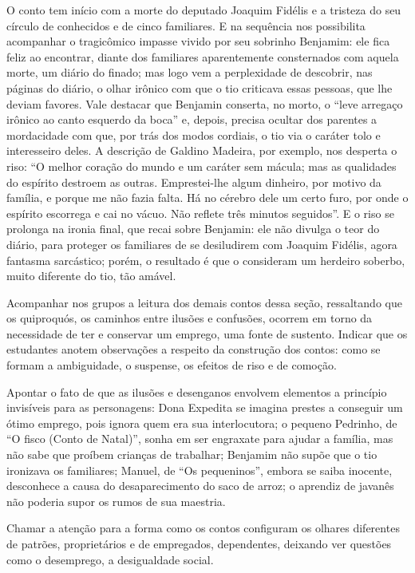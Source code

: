 O conto tem início com a morte do deputado Joaquim Fidélis e a tristeza
do seu círculo de conhecidos e de cinco familiares. E na sequência nos
possibilita acompanhar o tragicômico impasse vivido por seu sobrinho
Benjamim: ele fica feliz ao encontrar, diante dos familiares
aparentemente consternados com aquela morte, um diário do finado; mas
logo vem a perplexidade de descobrir, nas páginas do diário, o olhar
irônico com que o tio criticava essas pessoas, que lhe deviam favores.
Vale destacar que Benjamin conserta, no morto, o ``leve arregaço irônico
ao canto esquerdo da boca'' e, depois, precisa ocultar dos parentes a
mordacidade com que, por trás dos modos cordiais, o tio via o caráter
tolo e interesseiro deles. A descrição de Galdino Madeira, por exemplo,
nos desperta o riso: ``O melhor coração do mundo e um caráter sem
mácula; mas as qualidades do espírito destroem as outras. Emprestei-lhe
algum dinheiro, por motivo da família, e porque me não fazia falta. Há
no cérebro dele um certo furo, por onde o espírito escorrega e cai no
vácuo. Não reflete três minutos seguidos''. E o riso se prolonga na
ironia final, que recai sobre Benjamin: ele não divulga o teor do
diário, para proteger os familiares de se desiludirem com Joaquim
Fidélis, agora fantasma sarcástico; porém, o resultado é que o
consideram um herdeiro soberbo, muito diferente do tio, tão amável.

Acompanhar nos grupos a leitura dos demais contos dessa seção,
ressaltando que os quiproquós, os caminhos entre ilusões e confusões,
ocorrem em torno da necessidade de ter e conservar um emprego, uma fonte
de sustento. Indicar que os estudantes anotem observações a respeito da
construção dos contos: como se formam a ambiguidade, o suspense, os
efeitos de riso e de comoção.

Apontar o fato de que as ilusões e desenganos envolvem elementos a
princípio invisíveis para as personagens: Dona Expedita se imagina
prestes a conseguir um ótimo emprego, pois ignora quem era sua
interlocutora; o pequeno Pedrinho, de ``O fisco (Conto de Natal)'',
sonha em ser engraxate para ajudar a família, mas não sabe que proíbem
crianças de trabalhar; Benjamim não supõe que o tio ironizava os
familiares; Manuel, de ``Os pequeninos'', embora se saiba inocente,
desconhece a causa do desaparecimento do saco de arroz; o aprendiz de
javanês não poderia supor os rumos de sua maestria.

Chamar a atenção para a forma como os contos configuram os olhares
diferentes de patrões, proprietários e de empregados, dependentes,
deixando ver questões como o desemprego, a desigualdade social. 

